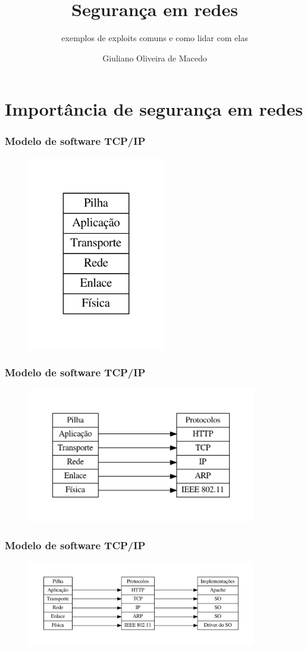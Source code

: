\documentclass{beamer}
\title{Segurança em redes}
\subtitle{exemplos de exploits comuns e como lidar com elas}
\author{Giuliano Oliveira de Macedo}
\institute{}
\date{}
\begin{document}
\begin{frame}
\titlepage 
\end{frame}

\section{Importância de segurança em redes}

\begin{frame}
\frametitle{Modelo de software TCP/IP }
\begin{figure}[htp]
	\includegraphics[width=6cm]{pilha1.pdf}
\end{figure}

\end{frame}

\begin{frame}
\frametitle{Modelo de software TCP/IP }
\begin{figure}[htp]
	\includegraphics[width=10cm]{pilha2.pdf}
\end{figure}

\end{frame}

\begin{frame}
\frametitle{Modelo de software TCP/IP }
\begin{figure}[htp]
	\includegraphics[width=10cm]{pilha3.pdf}
\end{figure}
\end{frame}
\end{document}
